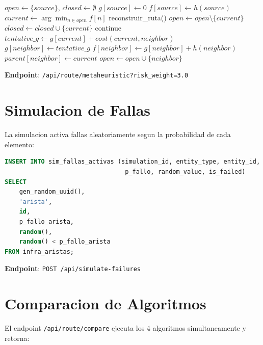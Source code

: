 \documentclass[12pt,a4paper]{article}
\begin{document}
\begin{algorithm}
\caption{A* Resiliente}
\begin{algorithmic}[1]
\State $open \gets \{source\}$, $closed \gets \emptyset$
\State $g[source] \gets 0$
\State $f[source] \gets h(source)$
    \State $current \gets \arg\min_{n \in open} f[n]$
        \State \Return reconstruir\_ruta()
    \EndIf
    \State $open \gets open \setminus \{current\}$
    \State $closed \gets closed \cup \{current\}$
            \State continue
        \EndIf
        \State $tentative\_g \gets g[current] + cost(current, neighbor)$
            \State $g[neighbor] \gets tentative\_g$
            \State $f[neighbor] \gets g[neighbor] + h(neighbor)$
            \State $parent[neighbor] \gets current$
            \State $open \gets open \cup \{neighbor\}$
        \EndIf
    \EndFor
\EndWhile
\end{algorithmic}
\end{algorithm}

\textbf{Endpoint}: \texttt{/api/route/metaheuristic?risk\_weight=3.0}

\section{Simulacion de Fallas}

La simulacion activa fallas aleatoriamente segun la probabilidad de cada elemento:

\begin{lstlisting}[language=SQL]
INSERT INTO sim_fallas_activas (simulation_id, entity_type, entity_id,
                                 p_fallo, random_value, is_failed)
SELECT
    gen_random_uuid(),
    'arista',
    id,
    p_fallo_arista,
    random(),
    random() < p_fallo_arista
FROM infra_aristas;
\end{lstlisting}

\textbf{Endpoint}: \texttt{POST /api/simulate-failures}

\section{Comparacion de Algoritmos}

El endpoint \texttt{/api/route/compare} ejecuta los 4 algoritmos simultaneamente y retorna:
\end{document}
